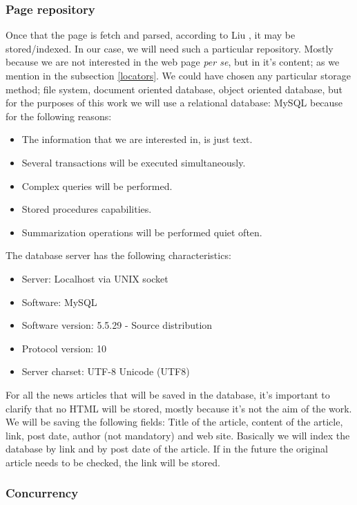 \subsubsection{Page repository}\label{pageRepository}
Once that the page is fetch and parsed, according to Liu \cite[p. 321]{L2011}, it may be stored/indexed. In our case, we will need such a particular repository. Mostly because we are not interested in the web page \emph{per se}, but in it's content; as we mention in the subsection \ref{locators}. We could have chosen any particular storage method; file system, document oriented database, object oriented database, but for the purposes of this work we will use a relational database: MySQL because for the following reasons:

\begin{itemize}
    \item The information that we are interested in, is just text.
    \item Several transactions will be executed simultaneously.
    \item Complex queries will be performed.
    \item Stored procedures capabilities.
    \item Summarization operations will be performed quiet often.
\end{itemize}

The database server has the following characteristics:

\begin{itemize}
    \item Server: Localhost via UNIX socket
    \item Software: MySQL
    \item Software version: 5.5.29 - Source distribution
    \item Protocol version: 10
    \item Server charset: UTF-8 Unicode (UTF8)
\end{itemize}

For all the news articles that will be saved in the database, it's important to clarify that no HTML will be stored, mostly because it's not the aim of the work. We will be saving the following fields: Title of the article, content of the article, link, post date, author (not mandatory) and web site. Basically we will index the database by link and by post date of the article. If in the future the original article needs to be checked, the link will be stored.

\subsubsection{Concurrency}\label{concurrency}

